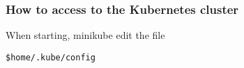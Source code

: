 \begin{frame}[fragile]
	\frametitle{How to access to the Kubernetes cluster}
	
	When starting, minikube edit the file \begin{verbatim}$home/.kube/config \end{verbatim}
\end{frame}